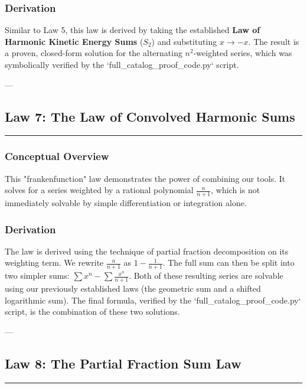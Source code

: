 \subsubsection*{Derivation}
Similar to Law 5, this law is derived by taking the established \textbf{Law of Harmonic Kinetic Energy Sums} ($S_2$) and substituting $x \to -x$. The result is a proven, closed-form solution for the alternating $n^2$-weighted series, which was symbolically verified by the `full\_catalog\_proof\_code.py` script.

---
\vspace{1cm}

\subsection*{Law 7: The Law of Convolved Harmonic Sums}
\hrule
\vspace{0.3cm}
\vspace{0.5cm}

\subsubsection*{Conceptual Overview}
This "frankenfunction" law demonstrates the power of combining our tools. It solves for a series weighted by a rational polynomial $\frac{n}{n+1}$, which is not immediately solvable by simple differentiation or integration alone.

\subsubsection*{Derivation}
The law is derived using the technique of partial fraction decomposition on its weighting term. We rewrite $\frac{n}{n+1}$ as $1 - \frac{1}{n+1}$. The full sum can then be split into two simpler sums: $\sum x^n - \sum \frac{x^n}{n+1}$. Both of these resulting series are solvable using our previously established laws (the geometric sum and a shifted logarithmic sum). The final formula, verified by the `full\_catalog\_proof\_code.py` script, is the combination of these two solutions.

---
\vspace{1cm}

\subsection*{Law 8: The Partial Fraction Sum Law}
\hrule
\vspace{0.3cm}
\vspace{0.5cm}

